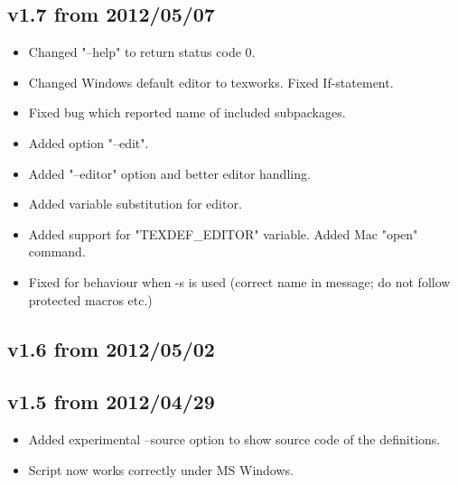 \documentclass{article}
\begin{document}
\subsection*{v1.7 from 2012/05/07}
\begin{itemize}
 \item Changed "--help" to return status code 0.
 \item Changed Windows default editor to texworks. Fixed If-statement.
 \item Fixed bug which reported name of included subpackages.
 \item Added option "--edit".
 \item Added "--editor" option and better editor handling.
 \item Added variable substitution for editor.
 \item Added support for "TEXDEF\_EDITOR" variable. Added Mac "open" command.
 \item Fixed for behaviour when -s is used (correct name in message; do not follow protected macros etc.)
\end{itemize}

\subsection*{v1.6 from 2012/05/02}

\subsection*{v1.5 from 2012/04/29}
\begin{itemize}
 \item Added experimental --source option to show source code of the definitions.
 \item Script now works correctly under MS Windows.
\end{itemize}
\end{document}
